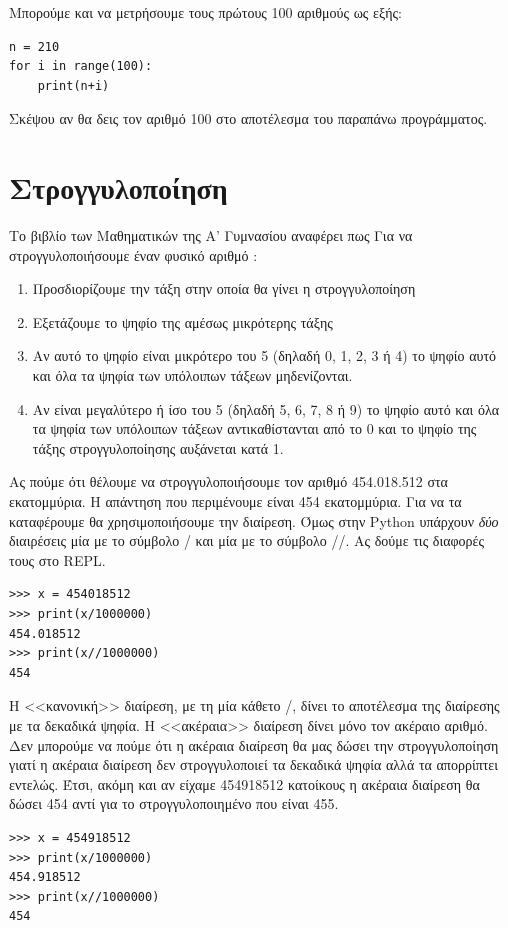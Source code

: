 Mπορούμε και να μετρήσουμε τους πρώτους 100 αριθμούς ως εξής:
\begin{lstlisting}
n = 210
for i in range(100):
    print(n+i)
\end{lstlisting}

Σκέψου αν θα δεις τον αριθμό 100 στο αποτέλεσμα του παραπάνω προγράμματος.

\section{Στρογγυλοποίηση}
Το βιβλίο των Μαθηματικών της Α' Γυμνασίου αναφέρει πως
Για να στρογγυλοποιήσουμε έναν φυσικό αριθμό :
\begin{enumerate}
	\item Προσδιορίζουμε την τάξη στην οποία θα γίνει η στρογγυλοποίηση
	\item Εξετάζουμε το ψηφίο της αμέσως μικρότερης τάξης
	\item Αν αυτό το ψηφίο είναι μικρότερο του 5 (δηλαδή 0, 1, 2, 3 ή 4) το ψηφίο αυτό και όλα τα ψηφία των υπόλοιπων τάξεων μηδενίζονται.
	\item Αν είναι μεγαλύτερο ή ίσο του 5 (δηλαδή 5, 6, 7, 8 ή 9) το ψηφίο αυτό και όλα τα ψηφία των υπόλοιπων τάξεων αντικαθίστανται από το 0 και το ψηφίο της τάξης στρογγυλοποίησης αυξάνεται κατά 1.
\end{enumerate}

Ας πούμε ότι θέλουμε να στρογγυλοποιήσουμε τον αριθμό 454.018.512 στα εκατομμύρια. Η απάντηση που περιμένουμε είναι 454 εκατομμύρια.
Για να τα καταφέρουμε θα χρησιμοποιήσουμε την διαίρεση. Όμως στην Python υπάρχουν \emph{δύο} διαιρέσεις μία με το σύμβολο / και μία με το σύμβολο //. Ας δούμε τις διαφορές τους στο REPL.
\begin{lstlisting}
>>> x = 454018512
>>> print(x/1000000)
454.018512
>>> print(x//1000000)
454
\end{lstlisting}
Η <<κανονική>> διαίρεση, με τη μία κάθετο /, δίνει το αποτέλεσμα της διαίρεσης με τα δεκαδικά ψηφία. Η <<ακέραια>> διαίρεση δίνει μόνο τον ακέραιο αριθμό. Δεν μπορούμε να πούμε ότι η ακέραια διαίρεση θα μας δώσει την στρογγυλοποίηση γιατί η ακέραια διαίρεση δεν στρογγυλοποιεί τα δεκαδικά ψηφία αλλά τα απορρίπτει εντελώς. Έτσι, ακόμη και αν είχαμε 454918512 κατοίκους η ακέραια διαίρεση θα δώσει 454 αντί για το στρογγυλοποιημένο που είναι 455.
\begin{lstlisting}
>>> x = 454918512
>>> print(x/1000000)
454.918512
>>> print(x//1000000)
454
\end{lstlisting}

